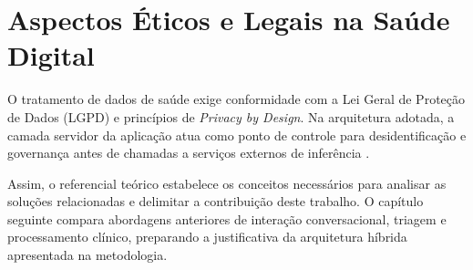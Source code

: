 \section{Aspectos Éticos e Legais na Saúde Digital}

O tratamento de dados de saúde exige conformidade com a Lei Geral de Proteção de Dados (LGPD) e princípios de \textit{Privacy by
Design}. Na arquitetura adotada, a camada servidor da aplicação atua como ponto de controle
para desidentificação e governança antes de chamadas a serviços externos de inferência
\cite{brasil2018}.

Assim, o referencial teórico estabelece os conceitos necessários para analisar as soluções
relacionadas e delimitar a contribuição deste trabalho. O capítulo seguinte compara abordagens
anteriores de interação conversacional, triagem e processamento clínico, preparando a justificativa
da arquitetura híbrida apresentada na metodologia.
